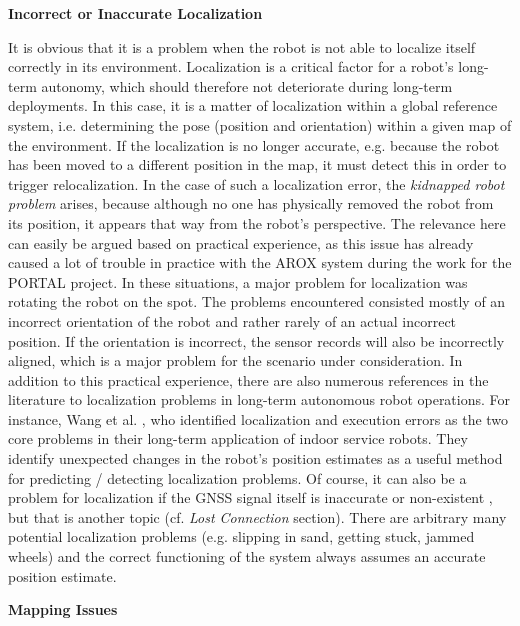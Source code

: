 \documentclass[english, master, utf8]{base/thesis_KBS}
\begin{document}
\noindent
\textbf{Incorrect or Inaccurate Localization}\newline

\noindent
It is obvious that it is a problem when the robot is not able to localize itself correctly in its environment.
Localization is a critical factor for a robot's long-term autonomy, which should therefore not deteriorate during long-term deployments. \cite{Hawes:2017}
In this case, it is a matter of localization within a global reference system, i.e. determining the pose (position and orientation) within a given map of the environment.
If the localization is no longer accurate, e.g. because the robot has been moved to a different position in the map, it must detect this in order to
trigger relocalization. In the case of such a localization error, the \textit{kidnapped robot problem} arises, because although no one has 
physically removed the robot from its position, it appears that way from the robot's perspective. \cite{Hertzberg:2012}
The relevance here can easily be argued based on practical experience, as this issue has already caused a lot of trouble in practice with the AROX system during 
the work for the PORTAL project. In these situations, a major problem for localization was rotating the robot on the spot.
The problems encountered consisted mostly of an incorrect orientation of the robot and rather rarely of an actual incorrect position.
If the orientation is incorrect, the sensor records will also be incorrectly aligned, which is a major problem for the scenario under consideration.
In addition to this practical experience, there are also numerous references in the literature to localization problems in long-term autonomous robot operations. For instance,
Wang et al. \cite{Wang:2018}, who identified localization and execution errors as the two core problems in their long-term application of indoor service robots.
They identify unexpected changes in the robot's position estimates as a useful method for predicting / detecting localization problems.
Of course, it can also be a problem for localization if the GNSS signal itself is inaccurate or non-existent \cite{Churchill:2013}, but that is another topic (cf. \textit{Lost Connection} section).
There are arbitrary many potential localization problems (e.g. slipping in sand, getting stuck, jammed wheels) and the correct functioning of the system always assumes an accurate
position estimate. \cite{Goldberg:2002}

\vfill
\pagebreak

\noindent
\textbf{Mapping Issues}\newline
\end{document}
